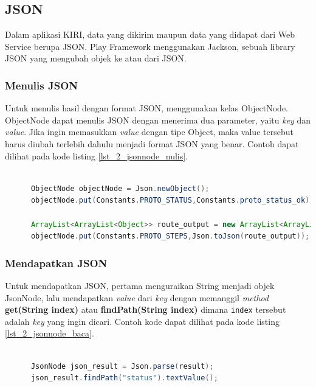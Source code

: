 \subsection{JSON}
Dalam aplikasi KIRI, data yang dikirim maupun data yang didapat dari Web Service berupa JSON. Play Framework menggunakan Jackson, sebuah library JSON yang mengubah objek ke atau dari JSON.

\subsubsection{Menulis JSON}
Untuk menulis hasil dengan format JSON, \play menggunakan kelas ObjectNode. ObjectNode dapat menulis JSON dengan menerima dua parameter, yaitu \textit{key} dan \textit{value}. Jika ingin memasukkan \textit{value} dengan tipe Object, maka value tersebut harus diubah terlebih dahulu menjadi format JSON yang benar. Contoh dapat dilihat pada kode listing \ref{lst_2_jsonnode_nulis}.

\begin{lstlisting}[caption=Contoh menulis JSON menggunakan ObjectNode,label = {lst_2_jsonnode_nulis},language=Java]
	
      ObjectNode objectNode = Json.newObject();
      objectNode.put(Constants.PROTO_STATUS,Constants.proto_status_ok);
      
      ArrayList<ArrayList<Object>> route_output = new ArrayList<ArrayList<Object>>();
      objectNode.put(Constants.PROTO_STEPS,Json.toJson(route_output));
\end{lstlisting}

\subsubsection{Mendapatkan JSON}
Untuk mendapatkan JSON, pertama menguraikan String menjadi objek JsonNode, lalu mendapatkan \textit{value} dari \textit{key} dengan memanggil \textit{method} \textbf{get(String index)} atau \textbf{findPath(String index)} dimana \verb!index! tersebut adalah \textit{key} yang ingin dicari. Contoh kode dapat dilihat pada kode listing \ref{lst_2_jsonnode_baca}.

\begin{lstlisting}[caption=Contoh mendapatkan JSON menggunakan JsonNode,label = {lst_2_jsonnode_baca},language=Java]
	
      JsonNode json_result = Json.parse(result);
      json_result.findPath("status").textValue();
\end{lstlisting} 

